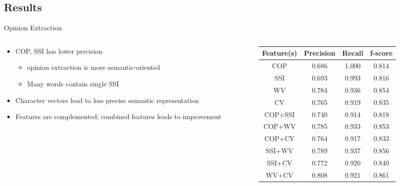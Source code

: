 \documentclass[compress]{beamer}
\begin{document}
    \subsection[allowframebreaks]{Results}
        \begin{frame}{Opinion Extraction}
            \begin{columns}
                \begin{column}[T]{.5\textwidth}
                    \begin{itemize}
                        \item COP, SSI has lower precision
                            \begin{itemize}
                                \item opinion extraction  is more semantic-oriented
                                \item Many words contain single SSI
                            \end{itemize}
                        \item Character vectors lead to less precise semantic representation
                        \item Features are complemented; combined features leads to improvement
                    \end{itemize}
                \end{column}
                \begin{column}[T]{.6\textwidth}
                    \begin{table}
                    \small
                    \centering
                    \tabcolsep=0.1cm
                    \begin{tabular}{cccc}
                    \hline
                    Feature(s) & Precision & Recall & f-score \\ \hline
                    COP        & 0.686     & 1.000  & 0.814   \\ \hline
                    SSI        & 0.693     & 0.993  & 0.816   \\ \hline
                    WV         & 0.784     & 0.936  & 0.854   \\ \hline
                    CV         & 0.765     & 0.919  & 0.835   \\ \hline
                    COP+SSI    & 0.740     & 0.914  & 0.818   \\ \hline
                    COP+WV     & 0.785     & 0.933  & 0.853   \\ \hline
                    COP+CV     & 0.764     & 0.917  & 0.833   \\ \hline
                    SSI+WV     & 0.789     & 0.937  & 0.856   \\ \hline
                    SSI+CV     & 0.772     & 0.920  & 0.840   \\ \hline
                    WV+CV      & 0.808     & 0.921  & 0.861   \\ \hline
                    \end{tabular}
                    \end{table}
                \end{column}
            \end{columns}
        \end{frame}
\end{document}
